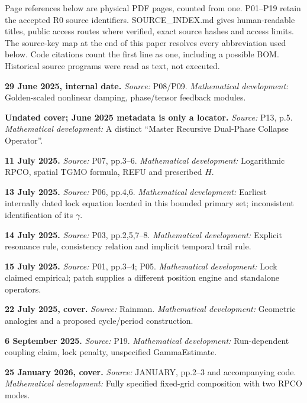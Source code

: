 \documentclass[11pt,a4paper]{article}
\begin{document}
Page references below are physical PDF pages, counted from one. P01--P19 retain the accepted R0 source identifiers. SOURCE\_\allowbreak{}INDEX.md gives human-readable titles, public access routes where verified, exact source hashes and access limits. The source-key map at the end of this paper resolves every abbreviation used below. Code citations count the first line as one, including a possible BOM. Historical source programs were read as text, not executed.


\par\smallskip\noindent\textbf{29 June 2025, internal date.} 
\textit{Source:} P08/P09. \textit{Mathematical development:} Golden-scaled nonlinear damping, phase/tensor feedback modules.
\par\smallskip\noindent\textbf{Undated cover; June 2025 metadata is only a locator.} 
\textit{Source:} P13, p.5. \textit{Mathematical development:} A distinct ``Master Recursive Dual-Phase Collapse Operator''.
\par\smallskip\noindent\textbf{11 July 2025.} 
\textit{Source:} P07, pp.3--6. \textit{Mathematical development:} Logarithmic RPCO, spatial TGMO formula, REFU and prescribed $H$.
\par\smallskip\noindent\textbf{13 July 2025.} 
\textit{Source:} P06, pp.4,6. \textit{Mathematical development:} Earliest internally dated lock equation located in this bounded primary set; inconsistent identification of its $\gamma$.
\par\smallskip\noindent\textbf{14 July 2025.} 
\textit{Source:} P03, pp.2,5,7--8. \textit{Mathematical development:} Explicit resonance rule, consistency relation and implicit temporal trail rule.
\par\smallskip\noindent\textbf{15 July 2025.} 
\textit{Source:} P01, pp.3--4; P05. \textit{Mathematical development:} Lock claimed empirical; patch supplies a different position engine and standalone operators.
\par\smallskip\noindent\textbf{22 July 2025, cover.} 
\textit{Source:} Rainman. \textit{Mathematical development:} Geometric analogies and a proposed cycle/period construction.
\par\smallskip\noindent\textbf{6 September 2025.} 
\textit{Source:} P19. \textit{Mathematical development:} Run-dependent coupling claim, lock penalty, unspecified GammaEstimate.
\par\smallskip\noindent\textbf{25 January 2026, cover.} 
\textit{Source:} JANUARY, pp.2--3 and accompanying code. \textit{Mathematical development:} Fully specified fixed-grid composition with two RPCO modes.
\end{document}
